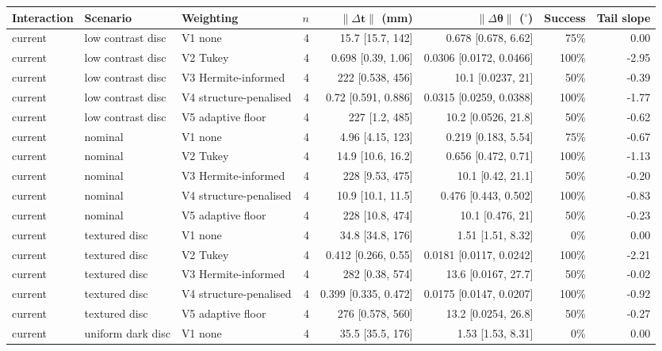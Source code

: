 \begin{tabular}{@{}lllrrrrr@{}}
\toprule
Interaction & Scenario & Weighting & $n$ & $\lVert\Delta\mathbf{t}\rVert$ (mm) & $\lVert\Delta\boldsymbol{\theta}\rVert$ ($^\circ$) & Success & Tail slope \\
\midrule
current & low contrast disc & V1 none & 4 & 15.7 [15.7, 142] & 0.678 [0.678, 6.62] & 75\% & 0.00 \\
current & low contrast disc & V2 Tukey & 4 & 0.698 [0.39, 1.06] & 0.0306 [0.0172, 0.0466] & 100\% & -2.95 \\
current & low contrast disc & V3 Hermite-informed & 4 & 222 [0.538, 456] & 10.1 [0.0237, 21] & 50\% & -0.39 \\
current & low contrast disc & V4 structure-penalised & 4 & 0.72 [0.591, 0.886] & 0.0315 [0.0259, 0.0388] & 100\% & -1.77 \\
current & low contrast disc & V5 adaptive floor & 4 & 227 [1.2, 485] & 10.2 [0.0526, 21.8] & 50\% & -0.62 \\
current & nominal & V1 none & 4 & 4.96 [4.15, 123] & 0.219 [0.183, 5.54] & 75\% & -0.67 \\
current & nominal & V2 Tukey & 4 & 14.9 [10.6, 16.2] & 0.656 [0.472, 0.71] & 100\% & -1.13 \\
current & nominal & V3 Hermite-informed & 4 & 228 [9.53, 475] & 10.1 [0.42, 21.1] & 50\% & -0.20 \\
current & nominal & V4 structure-penalised & 4 & 10.9 [10.1, 11.5] & 0.476 [0.443, 0.502] & 100\% & -0.83 \\
current & nominal & V5 adaptive floor & 4 & 228 [10.8, 474] & 10.1 [0.476, 21] & 50\% & -0.23 \\
current & textured disc & V1 none & 4 & 34.8 [34.8, 176] & 1.51 [1.51, 8.32] & 0\% & 0.00 \\
current & textured disc & V2 Tukey & 4 & 0.412 [0.266, 0.55] & 0.0181 [0.0117, 0.0242] & 100\% & -2.21 \\
current & textured disc & V3 Hermite-informed & 4 & 282 [0.38, 574] & 13.6 [0.0167, 27.7] & 50\% & -0.02 \\
current & textured disc & V4 structure-penalised & 4 & 0.399 [0.335, 0.472] & 0.0175 [0.0147, 0.0207] & 100\% & -0.92 \\
current & textured disc & V5 adaptive floor & 4 & 276 [0.578, 560] & 13.2 [0.0254, 26.8] & 50\% & -0.27 \\
current & uniform dark disc & V1 none & 4 & 35.5 [35.5, 176] & 1.53 [1.53, 8.31] & 0\% & 0.00 \\

\end{tabular}
